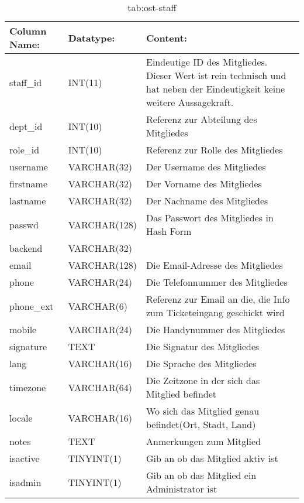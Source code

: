 \begin{table}[h]
	\begin{tabular}{|p{3.5cm}|p{4cm}|p{6.2cm}|}
		\hline
		\textbf{Column Name:} & \textbf{Datatype:} & \textbf{Content:}\\
		\hline
		staff\_id & INT(11) & Eindeutige ID des Mitgliedes. Dieser Wert ist rein technisch und hat neben der Eindeutigkeit keine weitere 
		Aussagekraft.\\
		\hline
		dept\_id & INT(10) & Referenz zur Abteilung des Mitgliedes \\
		\hline
		role\_id & INT(10) & Referenz zur Rolle des Mitgliedes\\
		\hline
		username & VARCHAR(32) & Der Username des Mitgliedes\\
		\hline
		firstname & VARCHAR(32) & Der Vorname des Mitgliedes\\
		\hline
		lastname & VARCHAR(32) &  Der Nachname des Mitgliedes\\
		\hline
		passwd & VARCHAR(128) & Das Passwort des Mitgliedes in Hash Form \\
		\hline
		backend & VARCHAR(32) & \\
		\hline
		email & VARCHAR(128) & Die Email-Adresse des Mitgliedes \\
		\hline
		phone & VARCHAR(24) & Die Telefonnummer des Mitgliedes \\
		\hline
		phone\_ext & VARCHAR(6) & Referenz zur Email an die, die Info zum Ticketeingang geschickt wird \\
		\hline
		mobile & VARCHAR(24) & Die Handynummer des Mitgliedes \\
		\hline
		signature & TEXT & Die Signatur des Mitgliedes \\
		\hline
		lang & VARCHAR(16) & Die Sprache des Mitgliedes \\
		\hline
		timezone & VARCHAR(64) & Die Zeitzone in der sich das Mitglied befindet \\
		\hline
		locale & VARCHAR(16)& Wo sich das Mitglied genau befindet(Ort, Stadt, Land) \\
		\hline
		notes & TEXT & Anmerkungen zum Mitglied\\
		\hline
		isactive & TINYINT(1) & Gib an ob das Mitglied aktiv ist\\
		\hline
		isadmin & TINYINT(1) & Gib an ob das Mitglied ein Administrator ist\\
		\hline
			\end{tabular}
			\caption{tab:ost-staff}
		\end{table}

